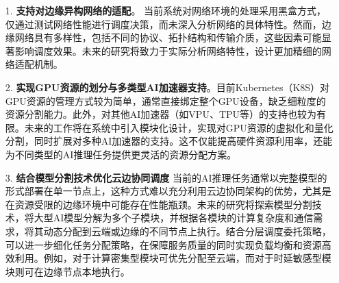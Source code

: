 \begin{enumerate}
    \item[1.] \textbf{支持对边缘异构网络的适配}。 当前系统对网络环境的处理采用黑盒方式，仅通过测试网络性能进行调度决策，而未深入分析网络的具体特性。然而，边缘网络具有多样性，包括不同的协议、拓扑结构和传输介质，这些因素可能显著影响调度效果。未来的研究将致力于实际分析网络特性，设计更加精细的网络适配机制。
    \item[2.] \textbf{实现GPU资源的划分与多类型AI加速器支持}。目前Kubernetes（K8S）对GPU资源的管理方式较为简单，通常直接绑定整个GPU设备，缺乏细粒度的资源分割能力。此外，对其他AI加速器（如VPU、TPU等）的支持也较为有限。未来的工作将在系统中引入模块化设计，实现对GPU资源的虚拟化和量化分割，同时扩展对多种AI加速器的支持。这不仅能提高硬件资源利用率，还能为不同类型的AI推理任务提供更灵活的资源分配方案。
    \item[3.] \textbf{结合模型分割技术优化云边协同调度} 当前的AI推理任务通常以完整模型的形式部署在单一节点上，这种方式难以充分利用云边协同架构的优势，尤其是在资源受限的边缘环境中可能存在性能瓶颈。未来的研究将探索模型分割技术，将大型AI模型分解为多个子模块，并根据各模块的计算复杂度和通信需求，将其动态分配到云端或边缘的不同节点上执行。结合分层调度委托策略，可以进一步细化任务分配策略，在保障服务质量的同时实现负载均衡和资源高效利用。例如，对于计算密集型模块可优先分配至云端，而对于时延敏感型模块则可在边缘节点本地执行。
\end{enumerate}
